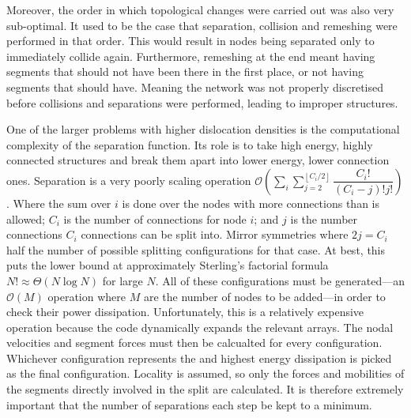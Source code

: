 Moreover, the order in which topological changes were carried out was also very sub-optimal. It used to be the case that separation, collision and remeshing were performed in that order. This would result in nodes being separated only to immediately collide again. Furthermore, remeshing at the end meant having segments that should not have been there in the first place, or not having segments that should have. Meaning the network was not properly discretised before collisions and separations were performed, leading to improper structures.

One of the larger problems with higher dislocation densities is the computational complexity of the separation function. Its role is to take high energy, highly connected structures and break them apart into lower energy, lower connection ones. Separation is a very poorly scaling operation $\mathcal{O}\left(\sum\limits_{i}\sum\limits_{j=2}^{\left\lfloor C_i/2 \right\rfloor} \dfrac{C_i!}{(C_i-j)! j!}\right)$. Where the sum over $i$ is done over the nodes with more connections than is allowed; $C_i$ is the number of connections for node $i$; and $j$ is the number connections $C_i$ connections can be split into. Mirror symmetries where $2j = C_i$ half the number of possible splitting configurations for that case. At best, this puts the lower bound at approximately Sterling's factorial formula $N! \approx \mathcal{\Theta}(N\log{N})$ for large $N$. All of these configurations must be generated---an $\mathcal{O}(M)$ operation where $M$ are the number of nodes to be added---in order to check their power dissipation. Unfortunately, this is a relatively expensive operation because the code dynamically expands the relevant arrays. The nodal velocities and segment forces must then be calcualted for every configuration. Whichever configuration represents the and highest energy dissipation is picked as the final configuration. Locality is assumed, so only the forces and mobilities of the segments directly involved in the split are calculated. It is therefore extremely important that the number of separations each step be kept to a minimum.

